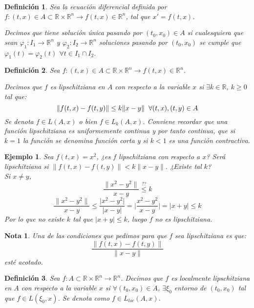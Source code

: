 \documentclass{article}
\providecommand{\norm}[1]{\lVert#1\rVert}
\providecommand{\abs}[1]{\lvert#1\rvert}
\theoremstyle{theorem-style}  %
\theoremstyle{definition-style}
\newtheorem{definition}{Definición}[section]
\newtheorem*{note}{Nota} %
\theoremstyle{example-style}
\newtheorem{example}{Ejemplo}[section]
\begin{document}
\begin{definition}
	Sea la ecuación diferencial definida por  $ f:(t,x) \in A \subset \mathbb{R}\times \mathbb{R}^n\longrightarrow f(t,x)\in \mathbb{R}^n$, tal que $ x'=f(t,x) $. 
	
	Decimos que tiene \emph{solución única} pasando por $(t_0, x_0) \in A$ si cualesquiera que sean $\varphi_1 : I_1 \longrightarrow \mathbb{R}^n$ y $\varphi_2 : I_2 \longrightarrow \mathbb{R}^n$ soluciones pasando por $(t_0, x_0)$ se cumple que $\varphi_1 (t) = \varphi_2 (t)$ $\forall t \in I_1 \cap I_2$.
\end{definition}
\begin{definition}
	Sea $ f:(t,x) \in A \subset \mathbb{R}\times \mathbb{R}^n\longrightarrow f(t,x)\in \mathbb{R}^n$.
	
	Decimos que $f$ es \emph{lipschitziana} en $A$ con respecto a la variable $x$ si $\exists k \in \mathbb{R}$, $k \geq 0$ tal que:
	\[\norm{f(t, x) - f(t, y)} \leq k\norm{x-y} \hspace{0,2cm} \forall (t, x), (t, y) \in A\]
	Se denota $f\in L(A, x)$ o bien $f \in L_k (A, x)$. Conviene recordar que una función lipschitziana es uniformemente continua y por tanto continua, que si $ k=1 $ la función se denomina función corta y si $ k<1 $ es una función contractiva.
\end{definition}
\begin{example}
	Sea $f(t, x) = x^2$, ¿es $f$ lipschitziana con respecto a $x$? Será lipschitziana si $\norm{f(t, x) - f(t, y)} < k\norm{x-y}$. ¿Existe tal $k$? \\
	Si $x \neq y$, 
	\[\frac{\norm{x^2 - y^2}}{x-y} \stackrel{??}{\leq} k\]
	\[\frac{\norm{x^2 - y^2}}{x-y} \leq \frac{\abs{x^2 - y^2}}{\abs{x - y}} = \abs{\frac{x^2 - y^2}{x - y}} = \abs{x+y} \leq k\]
	Por lo que no existe $k$ tal que $\abs{x+y} \leq k$, luego $f$ no es lipschitziana.
\end{example}
\begin{note}
	Una de las condiciones que pedimos para que $f$ sea lipschitziana es que:
	\[\frac{\norm{f(t, x) - f(t, y)}}{\norm{x - y}}\]
	esté acotado. 
\end{note}
\begin{definition}
	Sea $f: A \subset \mathbb{R} \times \mathbb{R}^n \longrightarrow \mathbb{R}^n$. Decimos que $f$ es \emph{localmente lipschitziana} en $A$ con respecto a la variable $x$ si $\forall (t_0, x_0) \in A$, $\exists\xi_0$ entorno de $(t_0, x_0)$ tal que $f \in L(\xi_0, x)$. Se denota como $f \in L_{loc}(A, x)$.
\end{definition}
\end{document}

